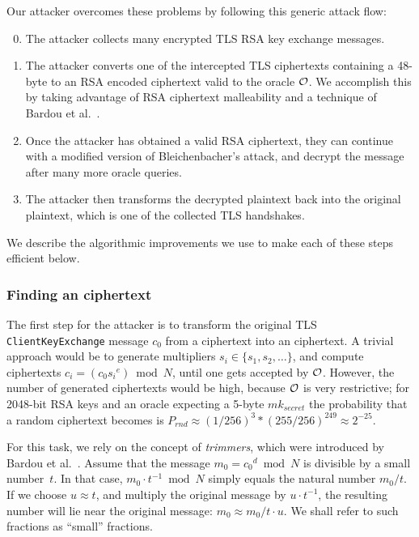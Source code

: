 Our attacker overcomes these problems by following this generic attack flow:
\begin{enumerate}
 \setcounter{enumi}{-1}
	\item The attacker collects many encrypted TLS RSA key exchange messages.
	\item The attacker converts one of the intercepted TLS ciphertexts containing a 48-byte \pms to an RSA \PKCS encoded ciphertext valid to the \ssltwo oracle $\mathcal{O}$. \ifext We accomplish this by taking advantage of RSA ciphertext malleability and a technique of Bardou et al.~\cite{efficient-padding-oracle-2012}. \fi
	\item Once the attacker has obtained a valid \ssltwo RSA ciphertext, they can continue with a modified version of Bleichenbacher's attack, and decrypt the message after many more oracle queries.
	\item The attacker then transforms the decrypted plaintext back into the original plaintext, which is one of the collected TLS handshakes.
\end{enumerate}

We describe the algorithmic improvements we use to make each of these steps efficient below.

\subsubsection{Finding an \sslconform ciphertext}
\label{sec:trimmers}
The first step for the attacker is to transform the original TLS \texttt{ClientKeyExchange} message $c_0$ from a \tlsconform ciphertext into an \sslconform ciphertext. 
\ifext
A trivial approach would be to generate multipliers $s_i \in \{s_1,s_2,\ldots\}$, and compute ciphertexts $c_i = (c_0 {s_i}^e) \bmod N$, until one gets accepted by $\mathcal{O}$.
However, the number of generated ciphertexts would be high, because $\mathcal{O}$ is very restrictive; for 2048-bit RSA keys and an oracle expecting a 5-byte $mk_{secret}$ the probability that a random ciphertext becomes \sslconform is $P_{rnd} \approx (1/256)^3 * (255/256)^{249} \approx 2^{-25}$.
\fi

For this task, we rely on the concept of \emph{trimmers}, which were introduced by Bardou et al.~\cite{efficient-padding-oracle-2012}. 
Assume that the message $m_{0} = {c_0}^d \bmod N$ is divisible by a small number~$t$. In that case,  $m_{0} \cdot t^{-1} \bmod{N}$ simply equals the natural number $m_{0} / t$. 
If we choose $u \approx t$, and multiply the original message by $u \cdot t^{-1}$, the resulting number will lie near the original message: $m_0 \approx m_0 / t \cdot u$.  \ifext We shall refer to such fractions as ``small'' fractions. \fi

